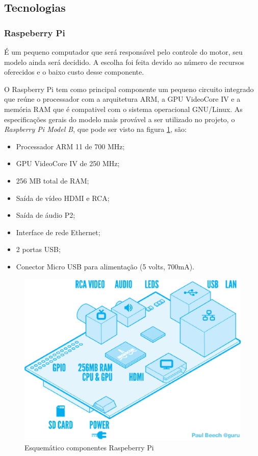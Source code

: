 \subsection{Tecnologias}

\subsubsection{Raspeberry Pi}

É um pequeno computador que será responsável pelo controle do motor, seu modelo ainda será decidido. A escolha foi feita devido ao número de recursos oferecidos e o baixo custo desse componente.

O Raspberry Pi tem como principal componente um pequeno circuito integrado que reúne o processador com a arquitetura ARM, a GPU VideoCore IV e a memória RAM que é compativel com o sistema operacional GNU/Linux. As especificações gerais do modelo mais provável a ser utilizado no projeto, o \textit{Raspberry Pi Model B}, que pode ser visto na figura \ref{fig:rasp}, são:

\begin{itemize}
 \item Processador ARM 11 de 700 MHz;
 \item GPU VideoCore IV de 250 MHz;
 \item 256 MB total de RAM;
 \item Saída de vídeo HDMI e RCA;
 \item Saída de áudio P2;
 \item Interface de rede Ethernet;
 \item 2 portas USB;
 \item Conector Micro USB para alimentação (5 volts, 700mA).
\end{itemize}

\begin{figure}[!htb]
\centering
  \includegraphics[keepaspectratio=true,scale=0.6]{figuras/controle/blueprint_rasp}
\caption{Esquemático componentes Raspeberry Pi}
\label{fig:rasp}
\end{figure}


